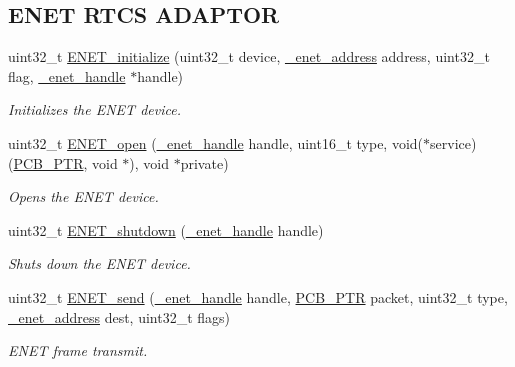 \subsection*{E\+N\+ET R\+T\+CS A\+D\+A\+P\+T\+OR}
\begin{DoxyCompactItemize}
\item 
uint32\+\_\+t \hyperlink{group__enet__rtcs__adaptor_gac1de3094198705ede1a0598484f91dc7}{E\+N\+E\+T\+\_\+initialize} (uint32\+\_\+t device, \hyperlink{group__enet__rtcs__adaptor_ga82c41b61a1376f4a48ede6c89b9c4f2f}{\+\_\+enet\+\_\+address} address, uint32\+\_\+t flag, \hyperlink{group__enet__rtcs__adaptor_gac8e61675abb18254042bf944bf122def}{\+\_\+enet\+\_\+handle} $\ast$handle)
\begin{DoxyCompactList}\small\item\em Initializes the E\+N\+ET device. \end{DoxyCompactList}\item 
uint32\+\_\+t \hyperlink{group__enet__rtcs__adaptor_gae3a026d58835998df02e9812f6f965a1}{E\+N\+E\+T\+\_\+open} (\hyperlink{group__enet__rtcs__adaptor_gac8e61675abb18254042bf944bf122def}{\+\_\+enet\+\_\+handle} handle, uint16\+\_\+t type, void($\ast$service)(\hyperlink{structpcb}{P\+C\+B\+\_\+\+P\+TR}, void $\ast$), void $\ast$private)
\begin{DoxyCompactList}\small\item\em Opens the E\+N\+ET device. \end{DoxyCompactList}\item 
uint32\+\_\+t \hyperlink{group__enet__rtcs__adaptor_ga275c7eccb5bbbfd1c3383405e1055cfa}{E\+N\+E\+T\+\_\+shutdown} (\hyperlink{group__enet__rtcs__adaptor_gac8e61675abb18254042bf944bf122def}{\+\_\+enet\+\_\+handle} handle)
\begin{DoxyCompactList}\small\item\em Shuts down the E\+N\+ET device. \end{DoxyCompactList}\item 
uint32\+\_\+t \hyperlink{group__enet__rtcs__adaptor_ga96c2aed9b57250d5d60fc8769993e756}{E\+N\+E\+T\+\_\+send} (\hyperlink{group__enet__rtcs__adaptor_gac8e61675abb18254042bf944bf122def}{\+\_\+enet\+\_\+handle} handle, \hyperlink{structpcb}{P\+C\+B\+\_\+\+P\+TR} packet, uint32\+\_\+t type, \hyperlink{group__enet__rtcs__adaptor_ga82c41b61a1376f4a48ede6c89b9c4f2f}{\+\_\+enet\+\_\+address} dest, uint32\+\_\+t flags)
\begin{DoxyCompactList}\small\item\em E\+N\+ET frame transmit. \end{DoxyCompactList}\item 

\end{DoxyCompactItemize}
